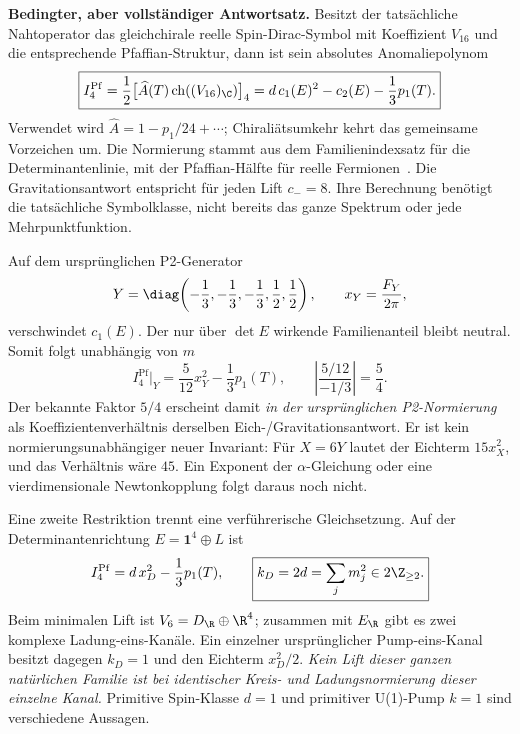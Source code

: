 \textbf{Bedingter, aber vollständiger Antwortsatz.}
Besitzt der tatsächliche Nahtoperator das gleichchirale reelle Spin-Dirac-Symbol mit Koeffizient $V_{16}$ und die entsprechende Pfaffian-Struktur, dann ist sein absolutes Anomaliepolynom
\begin{equation}\label{eq:nativeI4}
\boxed{
I_4^{\mathrm{Pf}}
=\frac12\bigl[\widehat A(T)\operatorname{ch}((V_{16})_{\C})\bigr]_4
=d\,c_1(E)^2-c_2(E)-\frac13p_1(T).
}
\end{equation}
Verwendet wird $\widehat A=1-p_1/24+\cdots$; Chiraliätsumkehr kehrt das gemeinsame Vorzeichen um. Die Normierung stammt aus dem Familienindexsatz für die Determinantenlinie, mit der Pfaffian-Hälfte für reelle Fermionen~\cite{freeddeterminant}. Die Gravitationsantwort entspricht für jeden Lift $c_-=8$. Ihre Berechnung benötigt die tatsächliche Symbolklasse, nicht bereits das ganze Spektrum oder jede Mehrpunktfunktion.

Auf dem ursprünglichen P2-Generator
\begin{equation}
Y=\diag\!\left(-\frac13,-\frac13,-\frac13,\frac12,\frac12\right),
\qquad x_Y=\frac{F_Y}{2\pi},
\end{equation}
verschwindet $c_1(E)$. Der nur über $\det E$ wirkende Familienanteil bleibt neutral. Somit folgt unabhängig von $m$
\begin{equation}
I_4^{\mathrm{Pf}}\big|_Y
=\frac5{12}x_Y^2-\frac13p_1(T),\qquad
\left|\frac{5/12}{-1/3}\right|=\frac54.
\end{equation}
Der bekannte Faktor $5/4$ erscheint damit \emph{in der ursprünglichen P2-Normierung} als Koeffizientenverhältnis derselben Eich-/Gravitationsantwort. Er ist kein normierungsunabhängiger neuer Invariant: Für $X=6Y$ lautet der Eichterm $15x_X^2$, und das Verhältnis wäre $45$. Ein Exponent der $\alpha$-Gleichung oder eine vierdimensionale Newtonkopplung folgt daraus noch nicht.

Eine zweite Restriktion trennt eine verführerische Gleichsetzung. Auf der Determinantenrichtung $E=\mathbf1^4\oplus L$ ist
\begin{equation}
I_4^{\mathrm{Pf}}=d\,x_D^2-\frac13p_1(T),\qquad
\boxed{k_D=2d=\sum_jm_j^2\in2\Z_{\ge2}.}
\end{equation}
Beim minimalen Lift ist $V_6=D_{\R}\oplus\R^4$; zusammen mit $E_{\R}$ gibt es zwei komplexe Ladung-eins-Kanäle. Ein einzelner ursprünglicher Pump-eins-Kanal besitzt dagegen $k_D=1$ und den Eichterm $x_D^2/2$. \emph{Kein Lift dieser ganzen natürlichen Familie ist bei identischer Kreis- und Ladungsnormierung dieser einzelne Kanal.} Primitive Spin-Klasse $d=1$ und primitiver U(1)-Pump $k=1$ sind verschiedene Aussagen.

